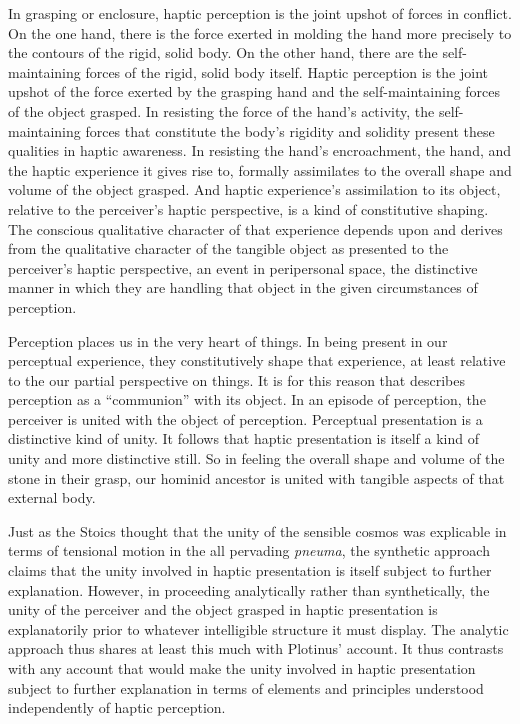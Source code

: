 In grasping or enclosure, haptic perception is the joint upshot of forces in conflict. On the one hand, there is the force exerted in molding the hand more precisely to the contours of the rigid, solid body. On the other hand, there are the self-maintaining forces of the rigid, solid body itself. Haptic perception is the joint upshot of the force exerted by the grasping hand and the self-maintaining forces of the object grasped. In resisting the force of the hand's activity, the self-maintaining forces that constitute the body's rigidity and solidity present these qualities in haptic awareness. In resisting the hand's encroachment, the hand, and the haptic experience it gives rise to, formally assimilates to the overall shape and volume of the object grasped. And haptic experience's assimilation to its object, relative to the perceiver's haptic perspective, is a kind of constitutive shaping. The conscious qualitative character of that experience depends upon and derives from the qualitative character of the tangible object as presented to the perceiver's haptic perspective, an event in peripersonal space, the distinctive manner in which they are handling that object in the given circumstances of perception.

Perception places us in the very heart of things. In being present in our perceptual experience, they constitutively shape that experience, at least relative to the our partial perspective on things. It is for this reason that \citet{Ardley:1958aa} describes perception as a ``communion'' with its object. In an episode of perception, the perceiver is united with the object of perception. Perceptual presentation is a distinctive kind of unity. It follows that haptic presentation is itself a kind of unity and more distinctive still. So in feeling the overall shape and volume of the stone in their grasp, our hominid ancestor is united with tangible aspects of that external body.

Just as the Stoics thought that the unity of the sensible cosmos was explicable in terms of tensional motion in the all pervading \emph{pneuma}, the synthetic approach claims that the unity involved in haptic presentation is itself subject to further explanation. However, in proceeding analytically rather than synthetically, the unity of the perceiver and the object grasped in haptic presentation is explanatorily prior to whatever intelligible structure it must display. The analytic approach thus shares at least this much with Plotinus' account. It thus contrasts with any account that would make the unity involved in haptic presentation subject to further explanation in terms of elements and principles understood independently of haptic perception. 


